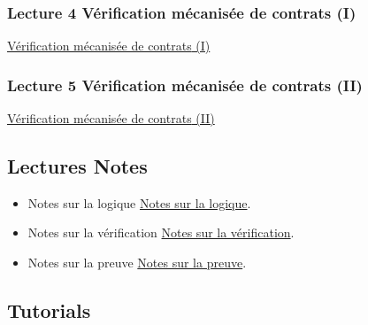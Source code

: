 \documentclass[ 12pt]{article}
\begin{document}
  
  \subsubsection{Lecture 4 {Vérification  mécanisée de contrats} (I)}
  
\href{http://mery54.github.io/teaching/movex/lecturesnotes/movexlecture4.pdf}{{Vérification  mécanisée de contrats} (I)}



  \subsubsection{Lecture 5 {Vérification  mécanisée de contrats} (II)}
  
\href{http://mery54.github.io/teaching/movex/lecturesnotes/movexlecture5.pdf}{{Vérification  mécanisée de contrats} (II)}



  

  \subsection{Lectures Notes}

  \begin{itemize}
  \item[]   Notes sur la logique
    \href{http://mery54.github.io/teaching/movex/lecturesnotes/preprint-chapterlogique.pdf}{Notes sur la logique}.

     \item[]   Notes sur la vérification
    \href{http://mery54.github.io/teaching/movex/lecturesnotes/preprint-chapterverification.pdf}{Notes
      sur la vérification}.

     \item[]   Notes sur la preuve
    \href{http://mery54.github.io/teaching/movex/lecturesnotes/preprint-chapterprouver.pdf}{Notes
      sur la preuve}.

  \end{itemize}


  

\subsection{Tutorials}
\end{document}
